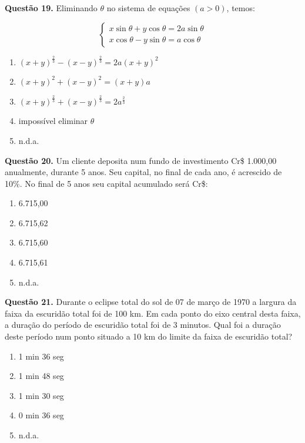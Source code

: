 \documentclass[11pt]{article}
\begin{document}
\textbf{Questão 19.} Eliminando $\theta$ no sistema de equações $(a > 0)$, temos: 

$$
\begin{cases}
x \sin \theta + y \cos \theta = 2a \sin \theta\\
x \cos \theta - y \sin \theta = a \cos \theta
\end{cases}
$$

\begin{enumerate}[\bf A (\quad)]
    \item $(x + y)^{\frac{2}{3}} - (x - y)^{\frac{2}{3}} = 2a(x + y)^2$
    \item $(x + y)^2 + (x - y)^2 = (x + y)a$
    \item $(x + y)^{\frac{2}{3}} + (x - y)^{\frac{2}{3}} = 2a^{\frac{2}{3}}$
    \item impossível eliminar $\theta$
    \item n.d.a.
\end{enumerate}

\textbf{Questão 20.} Um  cliente  deposita  num  fundo  de  investimento  Cr\$  1.000,00 anualmente, durante 5 anos. Seu capital, no final de  cada  ano,  é  acrescido  de  10\%.  No  final  de  5  anos  seu  capital acumulado será Cr\$:

\begin{enumerate}[\bf A (\quad)]
    \item 6.715,00
    \item 6.715,62
    \item 6.715,60
    \item 6.715,61
    \item n.d.a.
\end{enumerate}

\textbf{Questão 21.} Durante o eclipse total do sol de 07 de março de 1970 a  largura  da  faixa  da  escuridão  total  foi  de  100  km.  Em  cada  ponto  do  eixo  central  desta  faixa,  a  duração  do  período  de  escuridão  total  foi  de  3  minutos.  Qual  foi  a  duração  deste  período  num  ponto  situado  a  10  km  do  limite da faixa de escuridão total?

\begin{multicols}{3}
    \begin{enumerate}[\bf A (\quad)]
        \item 1 min 36 seg
        \item 1 min 48 seg
        \item 1 min 30 seg
        \item 0 min 36 seg
        \item n.d.a.
    \end{enumerate}
\end{multicols}
\end{document}
